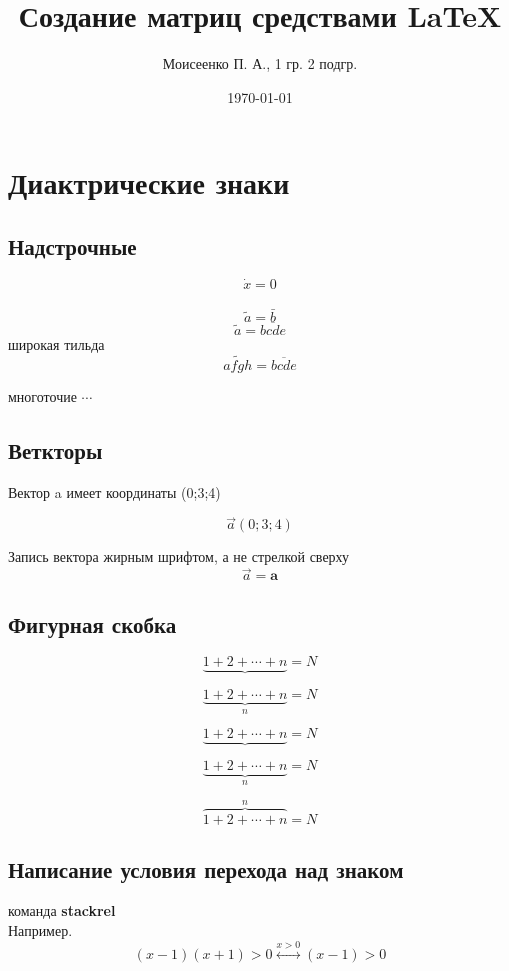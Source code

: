 \documentclass[a4paper,12pt]{article} %
\author{Моисеенко П. А., 1 гр. 2 подгр.}
\title{Создание матриц средствами \LaTeX}
\date{\today}
\begin{document}
\maketitle
\newpage
\section{Диактрические знаки}
\subsection{Надстрочные}
$$ \dot{x}=0 $$\\
$$ \tilde{a}=\bar{b} $$
$$ \tilde{a}=\overline{bcde} $$
широкая тильда\\
$$ \widetilde{afgh}=\overline{bcde} $$

многоточие $\cdots$

\subsection{Веткторы}
Вектор a имеет координаты (0;3;4)

$$ \overrightarrow{a}(0;3;4) $$

Запись вектора жирным шрифтом, а не стрелкой сверху
$$ \overrightarrow{a}=\mathbf{a} $$

\subsection{Фигурная скобка}
$$ \underbrace{1+2+\cdots+n}=N $$

$$ \underbrace{1+2+\cdots+n}_{n}=N $$

\begin{equation}
\underbrace{1+2+\cdots+n}=N
\end{equation}

\begin{equation}
\underbrace{1+2+\cdots+n}_{n}=N
\end{equation}

\begin{equation}
\overbrace{1+2+\cdots+n}^{n}=N
\end{equation}

\subsection{Написание условия перехода над знаком}
команда \textbf{stackrel}\\
Например.\\
$$ (x-1)(x+1)>0 \stackrel{x>0}{\longleftrightarrow}(x-1)>0 $$
\end{document}
